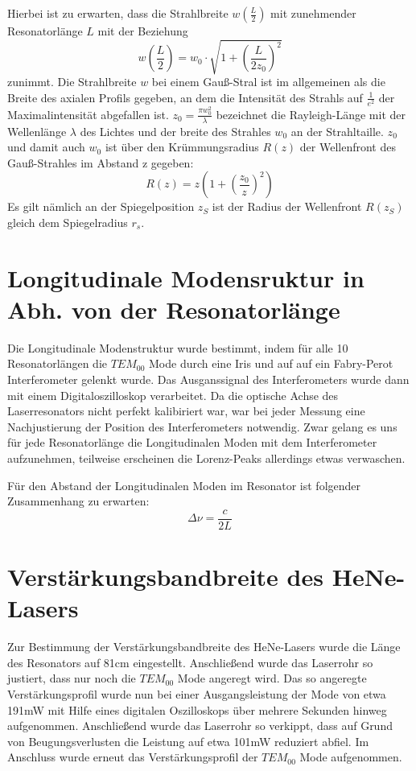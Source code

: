 \documentclass[bigchapter,colorback,accentcolor=tud4b,linedtoc,11pt]{tudreport}
\numberwithin{equation}{subsection}
\begin{document}
Hierbei ist zu erwarten, dass die Strahlbreite $w\left(\frac{L}{2}\right)$ mit zunehmender Resonatorlänge \(L\) mit der Beziehung 
$$w\left(\frac{L}{2}\right)=w_0\cdot\sqrt{1+\left({\frac{L}{2 z_0}}\right)^2}$$
zunimmt. Die Strahlbreite \(w\) bei einem Gauß-Stral ist im allgemeinen als die Breite des axialen Profils gegeben, an dem die Intensität des Strahls auf $\frac{1}{e^2}$ der Maximalintensität abgefallen ist. \(z_0=\frac{\pi w_0^2}{\lambda}\) bezeichnet die Rayleigh-Länge mit der Wellenlänge \(\lambda\) des Lichtes und der breite des Strahles \(w_0\) an der Strahltaille. \(z_0\) und damit auch \(w_0\) ist über den Krümmungsradius $R(z)$ der Wellenfront des Gauß-Strahles im Abstand z gegeben:
$$R(z) = z \left(1+\left(\frac{z_0}{z}\right)^2\right)$$
Es gilt nämlich an der Spiegelposition \(z_S\) ist der Radius der Wellenfront \(R(z_S)\) gleich dem Spiegelradius \(r_s\).


\FloatBarrier
\section{Longitudinale Modensruktur in Abh. von der Resonatorlänge}
Die Longitudinale Modenstruktur wurde bestimmt, indem für alle 10 Resonatorlängen die $TEM_{00}$ Mode durch eine Iris und auf auf ein Fabry-Perot Interferometer gelenkt wurde. Das Ausganssignal des Interferometers wurde dann mit einem Digitaloszilloskop verarbeitet.
Da die optische Achse des Laserresonators nicht perfekt kalibiriert war, war bei jeder Messung eine Nachjustierung der Position des Interferometers notwendig. Zwar gelang es uns für jede Resonatorlänge die Longitudinalen Moden mit dem Interferometer aufzunehmen, teilweise erscheinen die Lorenz-Peaks allerdings etwas verwaschen.

Für den Abstand der Longitudinalen Moden im Resonator ist folgender Zusammenhang zu erwarten:
$$\Delta\nu=\frac{c}{2L}$$
\FloatBarrier
\newpage
\section{Verstärkungsbandbreite des HeNe-Lasers}
Zur Bestimmung der Verstärkungsbandbreite des HeNe-Lasers wurde die Länge des Resonators auf 81cm eingestellt. Anschließend wurde das Laserrohr so justiert, dass nur noch die $TEM_{00}$ Mode angeregt wird. Das so angeregte Verstärkungsprofil wurde nun bei einer Ausgangsleistung der Mode von etwa 191mW mit Hilfe eines digitalen Oszilloskops über mehrere Sekunden hinweg aufgenommen. Anschließend wurde das Laserrohr so verkippt, dass auf Grund von Beugungsverlusten die Leistung auf etwa 101mW reduziert abfiel. Im Anschluss wurde erneut das Verstärkungsprofil der $TEM_{00}$ Mode aufgenommen.
\end{document}
